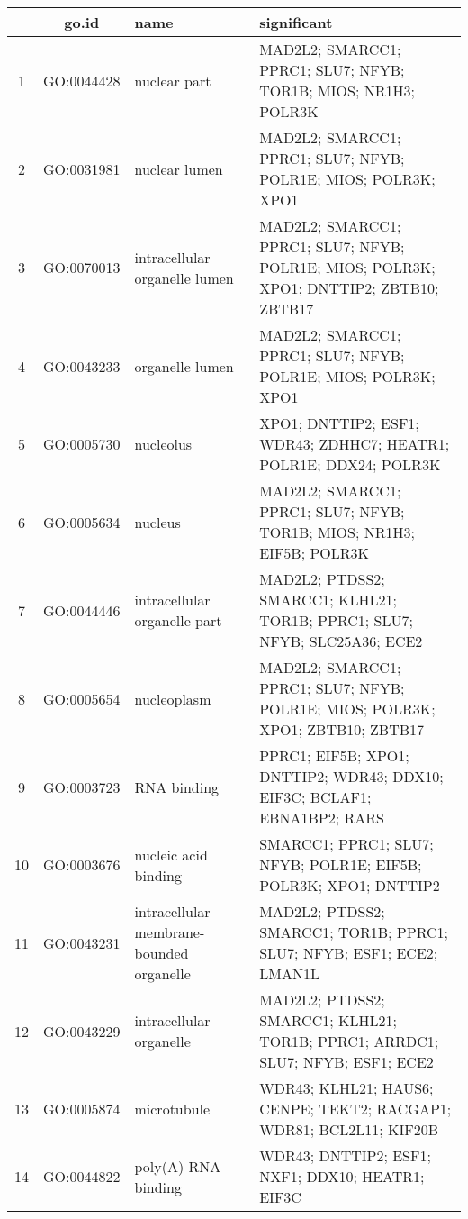 \documentclass[10pt,letterpaper]{article}
\begin{document}
\begin{table}[!hp]
\begin{adjustwidth}{-.5in}{0in}
\begin{tabular}{|c|c|p{1.5in}|p{4in}|}
  \hline
 & go.id & name  & significant \\
  \hline
1 & GO:0044428 & nuclear part  & \footnotesize{MAD2L2; SMARCC1; PPRC1; SLU7; NFYB; TOR1B; MIOS; NR1H3; POLR3K} \\
  2 & GO:0031981 & nuclear lumen & \footnotesize{MAD2L2; SMARCC1; PPRC1; SLU7; NFYB; POLR1E; MIOS; POLR3K; XPO1}\\
  3 & GO:0070013 & intracellular organelle lumen & \footnotesize{MAD2L2; SMARCC1; PPRC1; SLU7; NFYB; POLR1E; MIOS; POLR3K; XPO1; DNTTIP2; ZBTB10; ZBTB17} \\
  4 & GO:0043233 & organelle lumen & \footnotesize{MAD2L2; SMARCC1; PPRC1; SLU7; NFYB; POLR1E; MIOS; POLR3K; XPO1} \\
  5 & GO:0005730 & nucleolus & \footnotesize{XPO1; DNTTIP2; ESF1; WDR43; ZDHHC7; HEATR1; POLR1E; DDX24; POLR3K} \\
  6 & GO:0005634 & nucleus & \footnotesize{MAD2L2; SMARCC1; PPRC1; SLU7; NFYB; TOR1B; MIOS; NR1H3; EIF5B; POLR3K} \\
  7 & GO:0044446 & intracellular organelle part & \footnotesize{MAD2L2; PTDSS2; SMARCC1; KLHL21; TOR1B; PPRC1; SLU7; NFYB; SLC25A36; ECE2} \\
  8 & GO:0005654 & nucleoplasm & \footnotesize{MAD2L2; SMARCC1; PPRC1; SLU7; NFYB; POLR1E; MIOS; POLR3K; XPO1; ZBTB10; ZBTB17} \\
  9 & GO:0003723 & RNA binding & \footnotesize{PPRC1; EIF5B; XPO1; DNTTIP2; WDR43; DDX10; EIF3C; BCLAF1; EBNA1BP2; RARS}\\
  10 & GO:0003676 & nucleic acid binding & \footnotesize{SMARCC1; PPRC1; SLU7; NFYB; POLR1E; EIF5B; POLR3K; XPO1; DNTTIP2} \\
  11 & GO:0043231 & intracellular membrane-bounded organelle &  \footnotesize{MAD2L2; PTDSS2; SMARCC1; TOR1B; PPRC1; SLU7; NFYB; ESF1; ECE2; LMAN1L} \\
  12 & GO:0043229 & intracellular organelle & \footnotesize{MAD2L2; PTDSS2; SMARCC1; KLHL21; TOR1B; PPRC1; ARRDC1; SLU7; NFYB; ESF1; ECE2} \\
  13 & GO:0005874 & microtubule & \footnotesize{WDR43; KLHL21; HAUS6; CENPE; TEKT2; RACGAP1; WDR81; BCL2L11; KIF20B} \\
  14 & GO:0044822 & poly(A) RNA binding & \footnotesize{WDR43; DNTTIP2; ESF1; NXF1; DDX10; HEATR1; EIF3C} \\

\end{tabular}
\end{adjustwidth}
\end{table}
\end{document}

